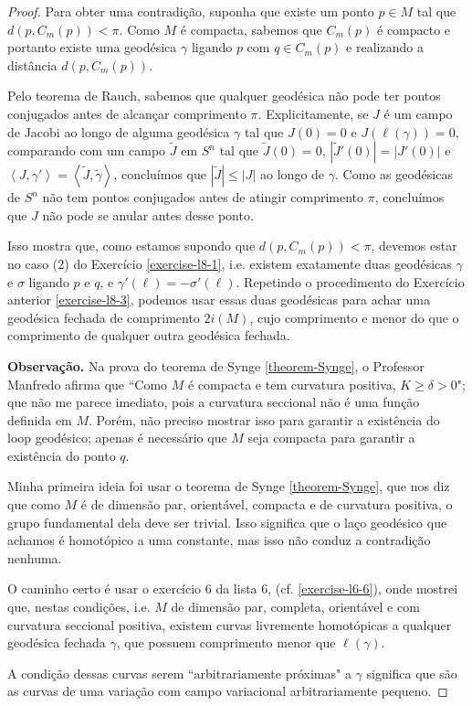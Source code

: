 \begin{proof}
Para obter uma contradição, suponha que existe um ponto $p \in M$ tal que
 $d(p, C_m(p))<\pi$. Como $M$ é compacta, sabemos que $C_m(p)$ é compacto e
portanto existe uma geodésica $\gamma$ ligando $p$ com $q \in C_m(p)$ e
realizando a distância $d(p,C_m(p))$.

Pelo teorema de Rauch, sabemos que qualquer geodésica não pode ter pontos
conjugados antes de alcançar comprimento $\pi$. Explicitamente, se $J$ é um
campo de Jacobi ao longo de alguma geodésica $\gamma$ tal que $J(0)=0$ e 
$J(\ell(\gamma))=0$, comparando com um campo $\tilde{J}$ em $S^n$ tal que
 $\tilde{J}(0)=0$, $|\tilde{J}'(0)|=|J'(0)|$ e 
$\left<J,\gamma'\right>=\left<\tilde{J},\tilde{\gamma}\right>$, concluímos que
 $|\tilde{J}|\leq |J|$ ao longo de $\gamma$. Como as geodésicas de $S^n$ não
 tem pontos conjugados antes de atingir comprimento $\pi$, concluímos que 
$J$ não pode se anular antes desse ponto.

Isso mostra que, como estamos supondo que $d(p,C_m(p))<\pi$, devemos estar no
caso (2) do Exercício \ref{exercise-l8-1}, i.e. existem exatamente duas
geodésicas $\gamma$ e $\sigma$ ligando $p$ e $q$, e
$\gamma'(\ell)=-\sigma'(\ell)$. Repetindo o procedimento do Exercício anterior
 \ref{exercise-l8-3}, podemos usar essas duas geodésicas para achar uma 
geodésica fechada de comprimento $2i(M)$, cujo comprimento e menor do que o
comprimento de qualquer outra geodésica fechada.

{\bf Observação.} Na prova do teorema de Synge \ref{theorem-Synge}, o Professor
Manfredo afirma que ``Como $M$ é compacta e tem curvatura positiva, $K\geq
\delta>0$"; que não me parece imediato, pois a curvatura seccional não é uma
função definida em $M$. Porém, não preciso mostrar isso para garantir a
existência do loop geodésico; apenas é necessário que $M$ seja compacta para
garantir a existência do ponto $q$.

Minha primeira ideia foi usar o teorema de Synge \ref{theorem-Synge}, 
que nos diz que como $M$ é de dimensão par, orientável, compacta e de 
curvatura positiva, o grupo fundamental dela deve ser trivial. 
Isso significa que o laço geodésico que achamos é homotópico a uma constante,
mas isso não conduz a contradição nenhuma.

O caminho certo é usar o exercício 6 da lista 6, (cf.
\ref{exercise-l6-6}), onde mostrei que, nestas condições, i.e. $M$ de dimensão
par, completa, orientável e com curvatura seccional positiva, existem curvas
livremente homotópicas a qualquer geodésica fechada $\gamma$, que possuem
comprimento menor que $\ell(\gamma)$.

A condição dessas curvas serem ``arbitrariamente próximas" a $\gamma$ significa
que são as curvas de uma variação com campo variacional arbitrariamente pequeno.

\end{proof}

